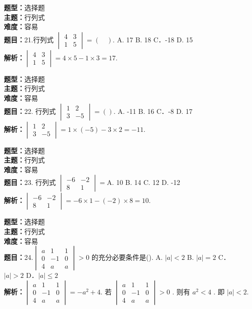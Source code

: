 \documentclass{ctexart}
\newenvironment{question}[5]{%
	\noindent\textbf{题型：}#1\\
	\textbf{主题：}#2\\
	\textbf{难度：}#3\\
	\textbf{题目：}#4\\
	\textbf{解析：}#5\\
	\vspace{1em}
}{}
\begin{document}
	
	\begin{question}
		{选择题}
		{行列式}
		{容易}
		{21.行列式 \(\begin{vmatrix} 4 & 3 \\ 1 & 5\end{vmatrix}=(\quad). \) A.  17 \quad B.  18 \quad C．-18 \quad D.  15}
		{\(\begin{vmatrix} 4 & 3 \\ 1 & 5\end{vmatrix}=4 \times 5-1 \times 3=17. \)}
	\end{question}
	
	
	\begin{question}
		{选择题}
		{行列式}
		{容易}
		{22. 行列式 \(\begin{vmatrix} 1 & 2 \\ 3 & -5\end{vmatrix}=().\) A. -11 B.  16 C．-8 D.  17}
		{\(\begin{vmatrix} 1 & 2 \\ 3 & -5\end{vmatrix}=1 \times(-5)-3 \times 2=-11.\)}
	\end{question}
	
	\begin{question}
		{选择题}
		{行列式}
		{容易}
		{23. 行列式 \(\begin{vmatrix} -6 & -2 \\ 8 & 1\end{vmatrix}=\)A.  10 B.  14 C.  12 D. -12}
		{\(\begin{vmatrix} -6 & -2 \\ 8 & 1\end{vmatrix}=-6 \times 1-(-2) \times 8=10. \)}
	\end{question}
	
	\begin{question}
		{选择题}
		{行列式}
		{容易}
		{24.\(\begin{vmatrix} a & 1 & 1 \\ 0 & -1 & 0 \\ 4 & a & a\end{vmatrix}>0\) 的充分必要条件是(\quad).  A. \(|a|<2\) B. \(|a|=2\) C．\(|a|>2\) D．\(|a| \leq 2\)}
		{\(\begin{vmatrix} a & 1 & 1 \\ 0 & -1 & 0 \\ 4 & a & a\end{vmatrix}=-a^2+4. \) 若 \(\begin{vmatrix} a & 1 & 1 \\ 0 & -1 & 0 \\ 4 & a & a\end{vmatrix}>0\) . 则有 \(a^2<4\) . 即 \(|a|<2.\)}
	\end{question}
	
\end{document}
